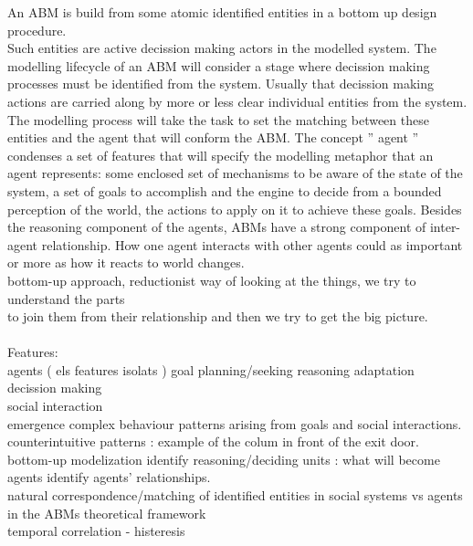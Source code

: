 \documentclass{report}
\begin{document}
An ABM is build from some atomic identified entities in a bottom up design procedure.\\
Such entities are active decission making actors in the modelled system. The modelling lifecycle of an ABM will consider a stage where decission making processes must be identified from the system. Usually that decission making 
actions are carried along by more or less clear individual entities from the system. The modelling process will take the task to set the matching between these entities and the agent that will conform the ABM. The concept 
'' agent '' condenses a set of features that will specify the modelling metaphor that an agent represents:
some enclosed set of mechanisms to be aware of the state of the system, a set of goals to accomplish and the engine to decide from a bounded perception of the world, the actions to apply on it to achieve these goals. Besides the reasoning component of the agents, ABMs have a strong component of inter-agent relationship. How one agent interacts with other agents could as important or more as how it reacts to world changes.
\\
bottom-up approach, reductionist way of looking at the things, we try to understand the parts\\
to join them from their relationship and then we try to get the big picture.
\\
\\
		Features:
\\
		  agents ( els features isolats )
		    goal planning/seeking
		    reasoning
		    adaptation
		    decission making
\\
		  social interaction
\\
		  emergence
		    complex behaviour patterns arising from goals and social interactions.
		    counterintuitive patterns : example of the colum in front of the exit door.
\\		    
		  bottom-up modelization
		    identify reasoning/deciding units : what will become agents
		    identify agents' relationships. 
\\
		  natural correspondence/matching of identified entities in social systems vs 
		  agents in the ABMs theoretical framework
\\
		  temporal correlation - histeresis
\\
\end{document}
